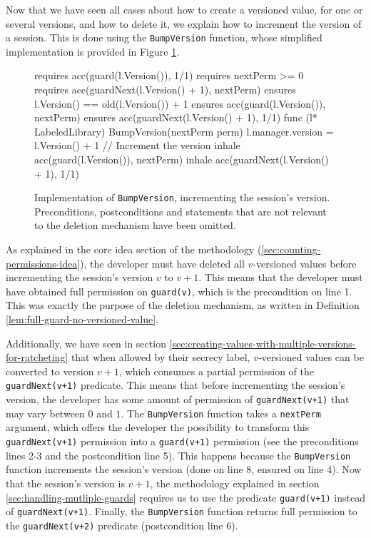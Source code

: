 Now that we have seen all cases about how to create a versioned value, for one or several versions, and how to delete it, we explain how to increment the version of a session. This is done using the \texttt{BumpVersion} function, whose simplified implementation is provided in Figure \ref{lst:bump-version}.

\begin{figure}
    \begin{gobra}
requires acc(guard(l.Version()), 1/1)
requires nextPerm >= 0
requires acc(guardNext(l.Version() + 1), nextPerm)
ensures  l.Version() == old(l.Version()) + 1
ensures  acc(guard(l.Version()), nextPerm)
ensures  acc(guardNext(l.Version() + 1), 1/1)
func (l* LabeledLibrary) BumpVersion(nextPerm perm) {
    l.manager.version = l.Version() + 1 // Increment the version
    inhale acc(guard(l.Version()), nextPerm)
    inhale acc(guardNext(l.Version() + 1), 1/1)
}
    \end{gobra}
    \caption{Implementation of \texttt{BumpVersion}, incrementing the session's version. Preconditions, postconditions and statements that are not relevant to the deletion mechanism have been omitted.}
    \label{lst:bump-version}
\end{figure}

As explained in the core idea section of the methodology (\ref{sec:counting-permissions-idea}), the developer must have deleted all $v$-versioned values before incrementing the session's version $v$ to $v+1$. This means that the developer must have obtained full permission on \texttt{guard(v)}, which is the precondition on line 1. This was exactly the purpose of the deletion mechanism, as written in Definition \ref{lem:full-guard-no-versioned-value}.

Additionally, we have seen in section \ref{sec:creating-values-with-multiple-versions-for-ratcheting} that when allowed by their secrecy label, $v$-versioned values can be converted to version $v+1$, which consumes a partial permission of the \texttt{guardNext(v+1)} predicate.
This means that before incrementing the session's version, the developer has some amount of permission of \texttt{guardNext(v+1)} that may vary between $0$ and $1$.
The \texttt{BumpVersion} function takes a \texttt{nextPerm} argument, which offers the developer the possibility to transform this \texttt{guardNext(v+1)} permission into a \texttt{guard(v+1)} permission (see the preconditions lines 2-3 and the postcondition line 5).
This happens because the \texttt{BumpVersion} function increments the session's version (done on line 8, ensured on line 4).
Now that the session's version is $v+1$, the methodology explained in section \ref{sec:handling-mutliple-guards} requires us to use the predicate \texttt{guard(v+1)} instead of \texttt{guardNext(v+1)}.
Finally, the \texttt{BumpVersion} function returns full permission to the \texttt{guardNext(v+2)} predicate (postcondition line 6).

